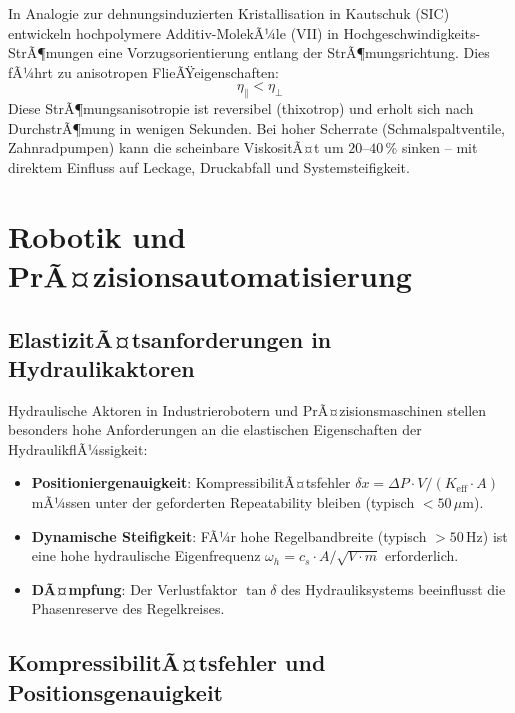 ﻿\documentclass[a4paper,12pt]{scrreprt}
\theoremstyle{definition}
\begin{document}
In Analogie zur dehnungsinduzierten Kristallisation in Kautschuk (SIC)
entwickeln hochpolymere Additiv-MolekÃ¼le (VII) in Hochgeschwindigkeits-StrÃ¶mungen
eine Vorzugsorientierung entlang der StrÃ¶mungsrichtung. Dies fÃ¼hrt zu
anisotropen FlieÃŸeigenschaften:
\begin{equation}
  \eta_{\parallel} < \eta_{\perp}
  \label{eq:anisotropie_vii}
\end{equation}
Diese StrÃ¶mungsanisotropie ist reversibel (thixotrop) und erholt sich
nach DurchstrÃ¶mung in wenigen Sekunden. Bei hoher Scherrate (Schmalspaltventile,
Zahnradpumpen) kann die scheinbare ViskositÃ¤t um $20$--$40\,\%$ sinken --
mit direktem Einfluss auf Leckage, Druckabfall und Systemsteifigkeit.

\section{Robotik und PrÃ¤zisionsautomatisierung}

\subsection{ElastizitÃ¤tsanforderungen in Hydraulikaktoren}

Hydraulische Aktoren in Industrierobotern und PrÃ¤zisionsmaschinen stellen
besonders hohe Anforderungen an die elastischen Eigenschaften der Hydraulik\-flÃ¼ssigkeit:

\begin{itemize}
  \item \textbf{Positioniergenauigkeit}: KompressibilitÃ¤tsfehler
    $\delta x = \Delta P \cdot V / (K_{\mathrm{eff}} \cdot A)$ mÃ¼ssen
    unter der geforderten Repeatability bleiben (typisch $< 50\,\mu\mathrm{m}$).
  \item \textbf{Dynamische Steifigkeit}: FÃ¼r hohe Regelbandbreite (typisch
    $> 50\,\mathrm{Hz}$) ist eine hohe hydraulische Eigenfrequenz
    $\omega_h = c_s \cdot A / \sqrt{V \cdot m}$ erforderlich.
  \item \textbf{DÃ¤mpfung}: Der Verlustfaktor $\tan\delta$ des Hydrauliksystems
    beeinflusst die Phasenreserve des Regelkreises.
\end{itemize}

\subsection{KompressibilitÃ¤tsfehler und Positionsgenauigkeit}
\end{document}
